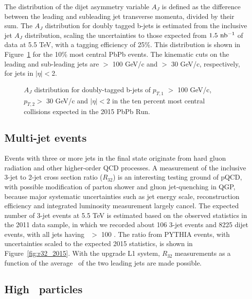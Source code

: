 The distribution of the dijet asymmetry variable $A_{J}$ is defined as the
difference between the leading and subleading jet transverse momenta,
divided by their sum.  
The $A_{J}$ distribution for doubly tagged b-jets is estimated from the
inclusive jet $A_{J}$ distribution, 
scaling the uncertainties to those expected from $1.5\ {\rm nb^{-1}}$ of data at
5.5 TeV, with a tagging efficiency of 25\%.  This distribution is shown in
Figure~\ref{fig:aj_2015} for the 10\% most central PbPb events.  
The kinematic cuts on the leading and sub-leading jets are \pt $>$ 100 GeV/c
and \pt $>$ 30 GeV/c, respectively, for jets in $|\eta| < $2.  


\begin{figure}[!ht]
\begin{center}
\caption{$A_{J}$ distribution for doubly-tagged b-jets of $p_{T,1}$ $> $ 100
GeV/c, $p_{T,2} > $ 30 GeV/c and $|\eta| < 2$ 
in the ten percent most central collisions expected in the 2015 PbPb Run.}
\label{fig:aj_2015}
\end{center}
\end{figure}

\subsection{Multi-jet events}

Events with three or more jets in the final state originate from hard gluon radiation and 
other higher-order QCD processes. A measurement of the inclusive 3-jet to 2-jet cross section 
ratio ($R_{32}$) is an interesting testing ground of pQCD, with possible modification of 
parton shower and gluon jet-quenching in QGP, because major systematic uncertainties such as 
jet energy scale, reconstruction efficiency and integrated luminosity measurement largely cancel. 
The expected number of 3-jet events at 5.5 TeV is estimated based on the observed statistics in the 2011 data sample, 
in which we recorded about 106 3-jet events and 8225 dijet events, with all jets having \pt\ $>$ 100 \GeVc.  
The ratio from PYTHIA events, with uncertainties scaled to the expected
2015 statistics, is shown in Figure~\ref{fig:r32_2015}. 
With the upgrade L1 system, $R_{32}$ measurements as a function of the
average \pt\ of the two leading jets are made possible.


\subsection{High \pt\ particles}

